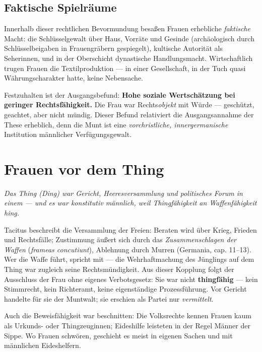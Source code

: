 \documentclass[11pt,a4paper,ngerman]{scrartcl}
\newcommand{\chipbase}[2]{\hspace{0pt}{\footnotesize\textcolor{#1}{[\textsc{#2}]}}}
\newcommand{\chipbelegt}[1]{\chipbase{chipgreen}{#1}}
\begin{document}
\subsection*{Faktische Spielräume}

Innerhalb dieser rechtlichen Bevormundung besaßen Frauen erhebliche \emph{faktische} Macht: die Schlüsselgewalt über Haus, Vorräte und Gesinde (archäologisch durch Schlüsselbeigaben in Frauengräbern gespiegelt), kultische Autorität als Seherinnen, und in der Oberschicht dynastische Handlungsmacht. Wirtschaftlich trugen Frauen die Textilproduktion — in einer Gesellschaft, in der Tuch quasi Währungscharakter hatte, keine Nebensache. \chipbelegt{belegt}

Festzuhalten ist der Ausgangsbefund: \textbf{Hohe soziale Wertschätzung bei geringer Rechtsfähigkeit.} Die Frau war Rechts\emph{objekt} mit Würde — geschützt, geachtet, aber nicht mündig. Dieser Befund relativiert die Ausgangsannahme der These erheblich, denn die Munt ist eine \emph{vorchristliche, innergermanische} Institution männlicher Verfügungsgewalt. \chipbelegt{belegt}


\section{Frauen vor dem Thing}

\noindent\textit{Das Thing (Ding) war Gericht, Heeresversammlung und politisches Forum in einem — und es war konstitutiv männlich, weil Thingfähigkeit an Waffenfähigkeit hing.}
\medskip

Tacitus beschreibt die Versammlung der Freien: Beraten wird über Krieg, Frieden und Rechtsfälle; Zustimmung äußert sich durch das \emph{Zusammenschlagen der Waffen} (\emph{frameas concutiunt}), Ablehnung durch Murren (Germania, cap. 11–13). Wer die Waffe führt, spricht mit — die Wehrhaftmachung des Jünglings auf dem Thing war zugleich seine Rechtsmündigkeit. Aus dieser Kopplung folgt der Ausschluss der Frau ohne eigenes Verbotsgesetz: Sie war nicht \textbf{thingfähig} — kein Stimmrecht, kein Richteramt, keine eigenständige Prozessführung. Vor Gericht handelte für sie der Muntwalt; sie erschien als Partei nur \emph{vermittelt}. \chipbelegt{belegt}

Auch die Beweisfähigkeit war beschnitten: Die Volksrechte kennen Frauen kaum als Urkunds- oder Thingzeuginnen; Eideshilfe leisteten in der Regel Männer der Sippe. Wo Frauen schwören, geschieht es meist in eigenen Sachen und mit männlichen Eideshelfern. \chipbelegt{belegt}
\end{document}
